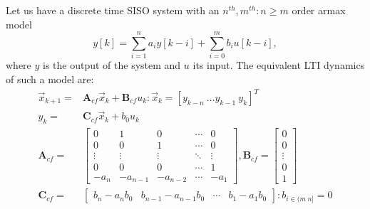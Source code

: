 \documentclass[runningheads,a4paper]{llncs}
\newcommand{\mat}[1]{\boldsymbol{#1}}
\begin{document}
Let us have a discrete time SISO system with an $n^{th},m^{th} : n\geq m$ order armax model
$$y[k]=\sum_{i=1}^n a_iy[k-i]+\sum_{i=0}^m b_iu[k-i],$$
where $y$ is the output of the system and $u$ its input.
The equivalent LTI dynamics of such a model are:
\begin{align}
\label{eq:cf_SISO}
\vec{x}_{k+1}=&\mat{A}_{cf}\vec{x}_k+\mat{B}_{cf}u_k : \vec{x}_k=[y_{k-n}\ \hdots y_{k-1}\ y_{k}]^T\\
y_k=&\mat{C}_{cf}\vec{x}_k + b_0u_k\nonumber\\
\mat{A}_{cf}=&\left[
\begin{array}{ccccc}
0&1&0&\cdots&0\\
0&0&1&\cdots&0\\
\vdots&\vdots&\vdots&\ddots&\vdots\\
0&0&0&\cdots&1\\
-a_n&-a_{n-1}&-a_{n-2}&\cdots&-a_1
\end{array}\right],
\mat{B}_{cf}=\left[
\begin{array}{c}
0\\0\\ \vdots\\ 0\\ 1
\end{array}\right]\nonumber\\
\mat{C}_{cf}=&[\begin{array}{ccccc}b_n-a_nb_0&b_{n-1}-a_{n-1}b_0&\cdots&b_1-a_1b_0\end{array}] : b_{i \in (m\ n]}=0\nonumber
\end{align}
\end{document}
